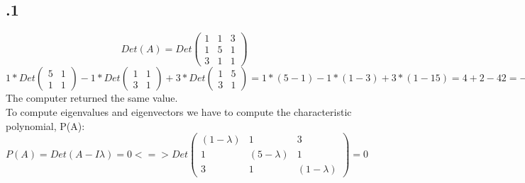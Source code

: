 \documentclass[a4paper]{article}
\begin{document}
\subsection*{.1}
$$ Det(A) = Det\left( \begin{matrix} 1 & 1 & 3 \\ 1 & 5 & 1 \\ 3 & 1 & 1 \end{matrix} \right)$$
$1 * Det \left( \begin{matrix} 5 & 1 \\ 1 & 1 \end{matrix} \right) - 1 * Det \left( \begin{matrix} 1 & 1 \\ 3 & 1 \end{matrix} \right) + 3 * Det \left( \begin{matrix} 1 & 5 \\ 3 & 1 \end{matrix} \right) = 1 * (5 - 1) -1 * (1 - 3) + 3 * (1 - 15) = 4 + 2 -42 = -36$\\
The computer returned the same value.\\
To compute eigenvalues and eigenvectors we have to compute the characteristic polynomial, P(A):\\
$$ P(A) = Det(A - I\lambda)= 0 <=> Det\left( \begin{matrix} (1 - \lambda) & 1 & 3 \\ 1 & (5 - \lambda) & 1 \\ 3 & 1 & (1 - \lambda) \end{matrix} \right) = 0$$
\end{document}
